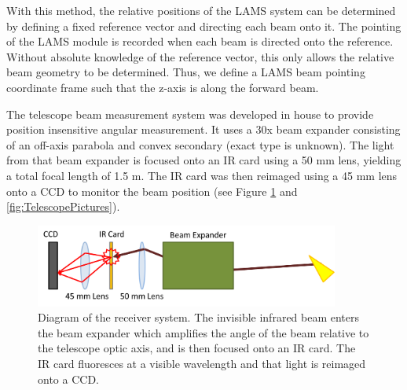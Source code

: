 \documentclass[12pt,twoside,english]{article}\usepackage[]{graphicx}\usepackage[]{color}
\begin{document}
{{With this method, the
relative positions of the LAMS system can be determined by defining a fixed reference vector and directing each beam onto it. The pointing of the LAMS module is recorded when each beam is directed onto the reference. Without absolute knowledge of the reference vector, this only allows the relative beam geometry to be determined. Thus, we define a LAMS beam pointing coordinate frame such that the z-axis is along the forward beam. 

The telescope beam measurement system was developed in house to provide position insensitive angular measurement. It uses a 30x beam expander consisting of an off-axis parabola and convex secondary (exact type is unknown). The light from that beam expander is focused onto an IR card using a 50 mm lens, yielding a total focal length of 1.5 m. The IR card was then reimaged using a 45 mm lens onto a CCD to monitor the beam position (see Figure \ref{fig:TelescopePointingRX} and \ref{fig:TelescopePictures}). 

\begin{figure}
\noindent \begin{centering}
\includegraphics[width=10cm]{SpecialGraphics/BeamPointing_ReceiverDiagram}  
\par\end{centering}
\protect\caption[Diagram of the LAMS receiver system]{\label{fig:TelescopePointingRX}Diagram of the receiver system. The invisible infrared beam enters the beam expander which amplifies the angle of the beam relative to the telescope optic axis, and is then focused onto an IR card. The IR card fluoresces at a visible wavelength and that light is reimaged onto a CCD.} 
\end{figure}

}}
\end{document}
